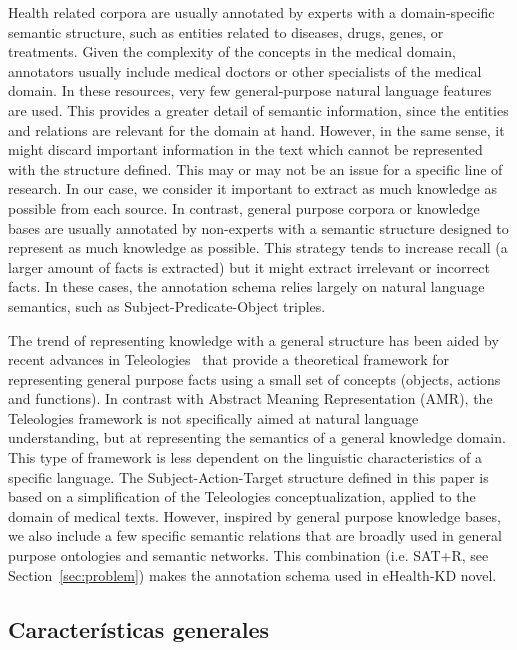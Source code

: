     Health related corpora are usually annotated by experts with a domain-specific
    semantic structure, such as entities related to diseases, drugs, genes, or
    treatments.
    Given the complexity of the concepts in the medical domain, annotators usually include
    medical doctors or other specialists of the medical domain.
    In these resources, very few general-purpose natural language features are used.
    This provides a greater detail of semantic information, since the entities and
    relations are relevant for the domain at hand.
    However, in the same sense, it might discard important information in the text
    which cannot be represented with the structure defined.
    This may or may not be an issue for a specific line of research.
    In our case, we consider it important to extract as much knowledge as
    possible from each source.
    In contrast, general purpose corpora or knowledge bases are usually annotated
    by non-experts with a semantic structure designed to represent as much
    knowledge as possible.
    This strategy tends to increase recall (a larger amount of facts is extracted)
    but it might extract irrelevant or incorrect facts.
    In these cases, the annotation schema relies largely on natural language semantics, such as Subject-Predicate-Object triples.

    The trend of representing knowledge with a general structure has been aided by recent
    advances in Teleologies~\cite{teleologies} that provide a theoretical framework for
    representing general purpose facts using a small set of concepts (objects,
    actions and functions).
    In contrast with Abstract Meaning Representation (AMR), the Teleologies framework is not
    specifically aimed at natural language understanding, but at representing
    the semantics of a general knowledge domain. This type of framework is less dependent
    on the linguistic characteristics of a specific language.
    The Subject-Action-Target structure defined in this paper is based on a simplification
    of the Teleologies conceptualization, applied to the domain of medical texts.
    However, inspired by general purpose knowledge bases, we also include a few specific
    semantic relations that are broadly used in general purpose ontologies and semantic networks.
    This combination (i.e. SAT+R, see Section~\ref{sec:problem}) makes the annotation schema used in eHealth-KD novel.

    \subsection{Características generales}

